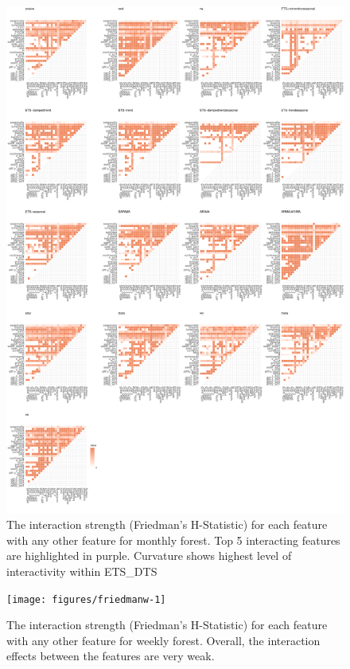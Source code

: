 \documentclass[11pt,a4paper,]{article}
\begin{document}
\begin{figure}
\centering
\includegraphics{figures/friedmanm-1.pdf}
\caption{\label{fig:friedmanm}The interaction strength (Friedman's H-Statistic) for each feature with any other feature for monthly forest. Top 5 interacting features are highlighted in purple. Curvature shows highest level of interactivity within ETS\_DTS}
\end{figure}

\begin{figure}[h]

{\centering \texttt{[image: figures/friedmanw-1]} 

}

\caption{The interaction strength (Friedman's H-Statistic) for each feature with any other feature for weekly forest. Overall, the interaction effects between the features are very weak.}\label{fig:friedmanw}
\end{figure}
\end{document}
